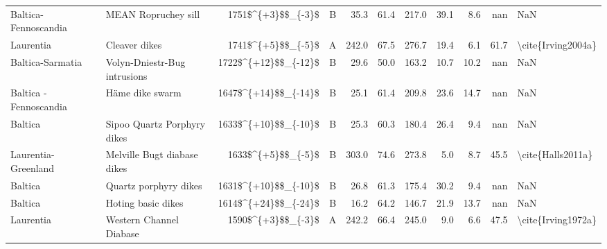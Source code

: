 \begin{longtable}{p{1 in}p{1 in}rrrrrrrr}
          Baltica-Fennoscandia &                                MEAN Ropruchey sill &     1751\$\textasciicircum \{+3\}\$\$\_\{-3\}\$ &      B &      35.3 &      61.4 & 217.0 &  39.1 &       8.6 &         nan &                                                NaN \\
                     Laurentia &                                      Cleaver dikes &     1741\$\textasciicircum \{+5\}\$\$\_\{-5\}\$ &      A &     242.0 &      67.5 & 276.7 &  19.4 &       6.1 &        61.7 &                                 \textbackslash cite\{Irving2004a\} \\
              Baltica-Sarmatia &                       Volyn-Dniestr-Bug intrusions &   1722\$\textasciicircum \{+12\}\$\$\_\{-12\}\$ &      B &      29.6 &      50.0 & 163.2 &  10.7 &      10.2 &         nan &                                                NaN \\
        Baltica - Fennoscandia &                                   Häme dike swarm  &   1647\$\textasciicircum \{+14\}\$\$\_\{-14\}\$ &      B &      25.1 &      61.4 & 209.8 &  23.6 &      14.7 &         nan &                                                NaN \\
                       Baltica &                        Sipoo Quartz Porphyry dikes &   1633\$\textasciicircum \{+10\}\$\$\_\{-10\}\$ &      B &      25.3 &      60.3 & 180.4 &  26.4 &       9.4 &         nan &                                                NaN \\
           Laurentia-Greenland &                        Melville Bugt diabase dikes &     1633\$\textasciicircum \{+5\}\$\$\_\{-5\}\$ &      B &     303.0 &      74.6 & 273.8 &   5.0 &       8.7 &        45.5 &                                  \textbackslash cite\{Halls2011a\} \\
                       Baltica &                              Quartz porphyry dikes &   1631\$\textasciicircum \{+10\}\$\$\_\{-10\}\$ &      B &      26.8 &      61.3 & 175.4 &  30.2 &       9.4 &         nan &                                                NaN \\
                       Baltica &                                 Hoting basic dikes &   1614\$\textasciicircum \{+24\}\$\$\_\{-24\}\$ &      B &      16.2 &      64.2 & 146.7 &  21.9 &      13.7 &         nan &                                                NaN \\
                     Laurentia &                            Western Channel Diabase &     1590\$\textasciicircum \{+3\}\$\$\_\{-3\}\$ &      A &     242.2 &      66.4 & 245.0 &   9.0 &       6.6 &        47.5 &                                 \textbackslash cite\{Irving1972a\} \\

\end{longtable}
